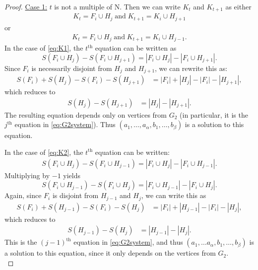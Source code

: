 \begin{proof}
\noindent
\underline{Case 1:} $t$ is not a multiple of N. Then we can write $K_t$ and $K_{t+1}$ as either
\begin{equation} \label{eq:K1}
\begin{aligned}
K_t = F_i \cup H_j \; \textrm{and} \; K_{t+1} = K_i \cup H_{j+1}
\end{aligned}
\end{equation}
or
\begin{equation} \label{eq:K2}
\begin{aligned}
K_t = F_i \cup H_j \; \textrm{and} \; K_{t+1} = K_i \cup H_{j-1}.
\end{aligned}
\end{equation}
In the case of \eqref{eq:K1}, the $t^{\textrm{th}}$ equation can be written as
$$
S(F_i \cup H_j) - S(F_i \cup H_{j+1}) = | F_{i} \cup H_{j}| - | F_{i} \cup H_{j+1}|.
$$
Since $F_{i}$ is necessarily disjoint from $H_{j}$ and $H_{j+1}$, we can rewrite this as:
\begin{equation*}
\begin{aligned}
S(F_i) + S(H_j) - S(F_i) - S(H_{j+1}) &=  |F_i| + | H_{j}| - |F_i| - |H_{j+1}|,
\end{aligned}
\end{equation*}
which reduces to
\begin{equation*}
\begin{aligned}
S(H_j) - S(H_{j+1}) &=  | H_{j}| - |H_{j+1}|.
\end{aligned}
\end{equation*}
The resulting equation depends only on vertices from $G_2$ (in particular, it is the $j^{\textrm{th}}$ equation in \eqref{eq:G2system}). Thus $(a_1, \dots, a_\alpha, b_1, \dots, b_\beta)$ is a solution to this equation. 

In the case of \eqref{eq:K2}, the $t^{\textrm{th}}$ equation can be written:
\begin{equation*}
\begin{aligned}
S(F_{i} \cup H_{j}) - S(F_{i} \cup H_{j-1}) = | F_{i} \cup H_{j}| - | F_{i} \cup H_{j-1}|.
\end{aligned}
\end{equation*}
Multiplying by $-1$ yields
$$
S(F_{i} \cup H_{j-1}) - S(F_{i} \cup H_{j}) = | F_{i} \cup H_{j-1}| - | F_{i} \cup H_{j}|.
$$
Again, since $F_i$ is disjoint from $H_{j-1}$ and $H_j$, we can write this as 
\begin{equation*}
\begin{aligned}
S(F_i) + S(H_{j-1}) - S(F_i) - S(H_{j}) &=  |F_i| + | H_{j-1}| - |F_i| - |H_{j}|,
\end{aligned}
\end{equation*}
which reduces to
\begin{equation*}
\begin{aligned}
S(H_{j-1}) - S(H_{j}) &= | H_{j-1}| - |H_{j}|.
\end{aligned}
\end{equation*}
This is the $(j-1)^{\textrm{th}}$ equation in \eqref{eq:G2system}, and thus $(a_1, \dots a_\alpha, b_1, \dots , b_\beta)$ is a solution to this equation, since it only depends on the vertices from $G_2$. \\


\end{proof}
